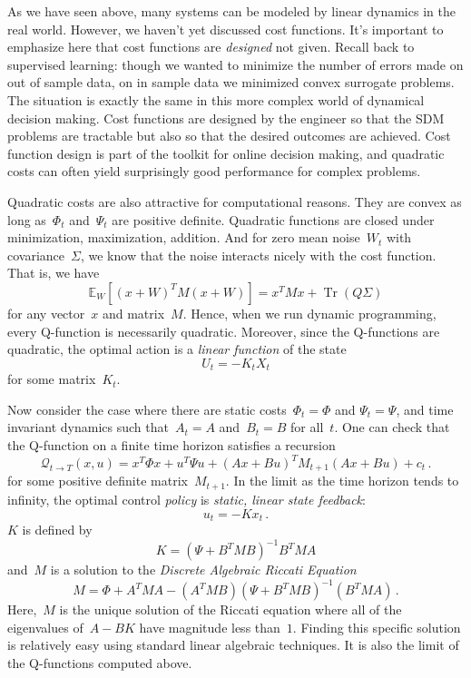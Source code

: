 \documentclass{tufte-book}
\begin{document}
As we have seen above, many systems can be modeled by linear dynamics in
the real world. However, we haven't yet discussed cost functions. It's
important to emphasize here that cost functions are \emph{designed} not
given. Recall back to supervised learning: though we wanted to minimize
the number of errors made on out of sample data, on in sample data we
minimized convex surrogate problems. The situation is exactly the same
in this more complex world of dynamical decision making. Cost functions
are designed by the engineer so that the SDM problems are tractable but
also so that the desired outcomes are achieved. Cost function design is
part of the toolkit for online decision making, and quadratic costs can
often yield surprisingly good performance for complex problems.

Quadratic costs are also attractive for computational reasons. They are
convex as long as~\(\Phi_t\) and~\(\Psi_t\) are positive definite.
Quadratic functions are closed under minimization, maximization,
addition. And for zero mean noise~\(W_t\) with covariance~\(\Sigma\), we
know that the noise interacts nicely with the cost function. That is, we
have \[
    \mathbb{E}_W[(x+W)^T M (x+W)] = x^T M x + \operatorname{Tr}(Q\Sigma)
\] for any vector~\(x\) and matrix~\(M\). Hence, when we run dynamic
programming, every Q-function is necessarily quadratic. Moreover, since
the Q-functions are quadratic, the optimal action is a \emph{linear
function} of the state \[
    U_t = -K_t X_t
\] for some matrix~\(K_t\).

Now consider the case where there are static costs~\(\Phi_t=\Phi\) and
\(\Psi_t=\Psi\), and time invariant dynamics such that~\(A_t=A\)
and~\(B_t=B\) for all~\(t\). One can check that the Q-function on a
finite time horizon satisfies a recursion \[
 \mathcal{Q}_{t \rightarrow T}(x,u) = x^T \Phi x + u^T \Psi u + (Ax+Bu)^T M_{t+1} (Ax+Bu) + c_t\,.
\] for some positive definite matrix~\(M_{t+1}\). In the limit as the
time horizon tends to infinity, the optimal control \emph{policy} is
\emph{static, linear state feedback}: \[
    u_t = -K x_t\,.
\] \(K\) is defined by \[
    K=(\Psi + B^T M B)^{-1} B^T M A
\] and~\(M\) is a solution to the \emph{Discrete Algebraic Riccati
Equation} \[
M = \Phi + A^T M A - (A^T M B)(\Psi + B^T M B)^{-1} (B^T M A)\,.
\] Here,~\(M\) is the unique solution of the Riccati equation where all
of the eigenvalues of~\(A-BK\) have magnitude less than~\(1\). Finding
this specific solution is relatively easy using standard linear
algebraic techniques. It is also the limit of the Q-functions computed
above.
\end{document}
